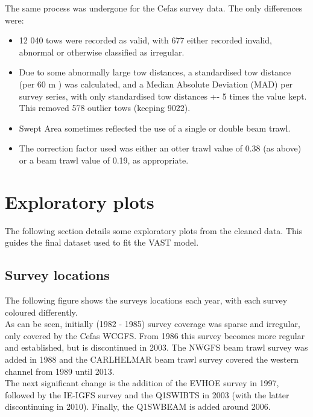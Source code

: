 \documentclass[12pt]{article}\usepackage[]{graphicx}\usepackage[]{color}
\begin{document}
The same process was undergone for the Cefas survey data. The only differences
were:

\begin{itemize}
	\item 12 040 tows were recorded as valid, with 677 either recorded
		invalid, abnormal or otherwise classified as irregular.
	\item Due to some abnormally large tow distances, a standardised tow
		distance (per 60 m ) was calculated, and a Median Absolute
		Deviation (MAD) per survey series, with only standardised tow
		distances +- 5 times the value kept. This removed 578 outlier
		tows (keeping 9022).
	\item Swept Area sometimes reflected the use of a single or double beam
		trawl.
	\item The correction factor used was either an otter trawl value of
		0.38 (as above) or a beam trawl value of 0.19, as appropriate.
\end{itemize}

\section{Exploratory plots}

The following section details some exploratory plots from the cleaned data.
This guides the final dataset used to fit the VAST model.




\subsection{Survey locations}

The following figure shows the surveys locations each year, with each survey
coloured differently.\\

As can be seen, initially (1982 - 1985) survey coverage was sparse and
irregular, only covered by the Cefas WCGFS. From 1986 this survey becomes more
regular and established, but is discontinued in 2003. The NWGFS beam trawl
survey was added in 1988 and the CARLHELMAR beam trawl survey covered the
western channel from 1989 until 2013.\\

The next significant change is the addition of the EVHOE survey in 1997,
followed by the IE-IGFS survey and the Q1SWIBTS in 2003 (with the latter
discontinuing in 2010). Finally, the Q1SWBEAM is added around 2006. \\
\end{document}

